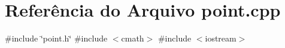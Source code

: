 \section{Referência do Arquivo point.\+cpp}
\label{point_8cpp}
{\ttfamily \#include \char`\"{}point.\+h\char`\"{}}\newline
{\ttfamily \#include $<$cmath$>$}\newline
{\ttfamily \#include $<$iostream$>$}\newline
